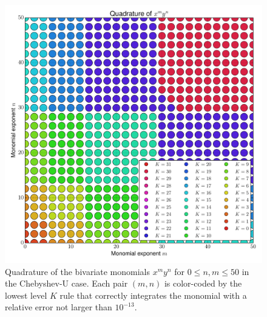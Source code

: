 \documentclass[a4paper,10pt]{article}
\begin{document}
\begin{figure}[h]
  \centering
  \includegraphics[width=\linewidth]{./img/monomial_errors_chebyshevu_2D.pdf}
  \caption{Quadrature of the bivariate monomials $x^m y^n$ for $0 \leq n, m \leq 50$
  in the Chebyshev-U case.
  Each pair $(m,n)$ is color-coded by the lowest level $K$ rule that correctly
  integrates the monomial with a relative error not larger than $10^{-13}$.}
  \label{fig:monomial_errors_chebyshevu_2D}
\end{figure}
\end{document}
